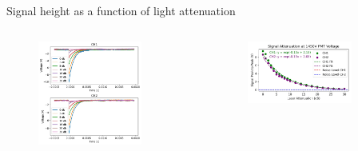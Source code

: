 \begin{frame}{Signal height as a function of light attenuation}
    \begin{columns}
        \begin{column}{0.5\textwidth}
            \begin{figure}
                \centering
                \includegraphics[width=0.8\textwidth, frame]{images/db_sigs_0_30.jpg}
            \end{figure}
        \end{column}
        \begin{column}{0.5\textwidth}
            \begin{figure}
                \centering
                \includegraphics[width=0.8\textwidth, frame]{images/att_sig_exp_1450V_fit.jpg}
            \end{figure}
        \end{column}
    \end{columns}
\end{frame}


